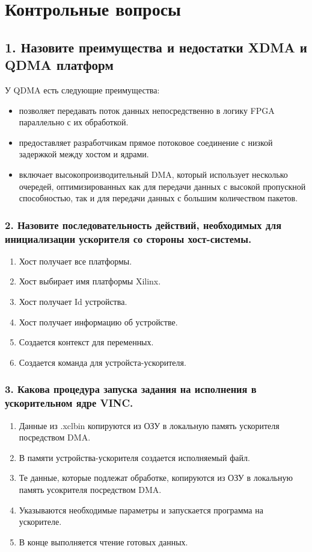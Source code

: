 \section*{Контрольные вопросы}

\subsection*{1. Назовите преимущества и недостатки XDMA и QDMA платформ}
У QDMA есть следующие преимущества:
\begin{itemize}
	\item позволяет передавать поток данных непосредственно в логику FPGA параллельно с их обработкой.
	\item предоставляет разработчикам прямое потоковое соединение с низкой задержкой между хостом и ядрами.
	\item включает высокопроизводительный DMA, который использует несколько очередей, оптимизированных как для передачи данных с высокой пропускной способностью, так и для передачи данных с большим количеством пакетов.
\end{itemize}

\subsubsection*{2. Назовите последовательность действий, необходимых для инициализации ускорителя со стороны хост-системы.}

\begin{enumerate}
	\item Хост получает все платформы.
	\item Хост выбирает имя платформы Xilinx.
	\item Хост получает Id устройства.
	\item Хост получает информацию об устройстве.
	\item Создается контекст для переменных.
	\item Создается команда для устройста-ускорителя.
\end{enumerate}

\subsubsection*{3. Какова процедура запуска задания на исполнения в ускорительном ядре VINC.}

\begin{enumerate}
	\item Данные из .xclbin копируются из ОЗУ в локальную память ускорителя посредством DMA.
	\item В памяти устройства-ускорителя создается исполняемый файл.
	\item Те данные, которые подлежат обработке, копируются из ОЗУ в локальную память усокрителя посредством DMA.
	\item Указываются необходимые параметры и запускается программа на ускорителе.
	\item В конце выполняется чтение готовых данных. 
\end{enumerate}

